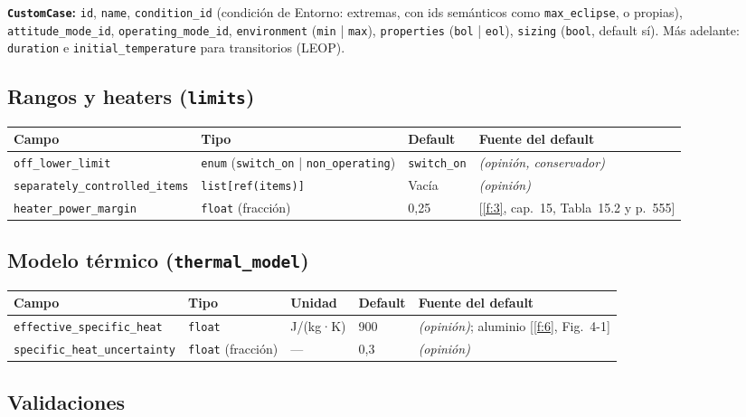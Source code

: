 \documentclass[11pt,a4paper]{article}
\newcommand{\code}[1]{\texttt{#1}}
\newcommand{\op}[1]{\textcolor{opinion}{\textit{(#1)}}}
\newcommand{\f}[1]{\ref{f:#1}}
\begin{document}
\textbf{\code{CustomCase}:} \code{id}, \code{name}, \code{condition\_id} (condición de Entorno: extremas, con ids semánticos como \code{max\_eclipse}, o propias), \code{attitude\_mode\_id}, \code{operating\_mode\_id}, \code{environment} (\code{min} | \code{max}), \code{properties} (\code{bol} | \code{eol}), \code{sizing} (\code{bool}, default sí). Más adelante: \code{duration} e \code{initial\_temperature} para transitorios (LEOP).

\subsection{Rangos y heaters (\code{limits})}

{\small
\begin{xltabular}{\textwidth}{@{}P{4.6cm}P{4.4cm}P{1.6cm}L@{}}
\toprule
\textbf{Campo} & \textbf{Tipo} & \textbf{Default} & \textbf{Fuente del default} \\
\midrule
\endhead
\code{off\_lower\_limit} & \code{enum} (\code{switch\_on} | \code{non\_operating}) & \code{switch\_on} & \op{opinión, conservador} \\
\code{separately\_controlled\_items} & \code{list[ref(items)]} & Vacía & \op{opinión} \\
\code{heater\_power\_margin} & \code{float} (fracción) & 0,25 & [\f{3}, cap.~15, Tabla~15.2 y p.~555] \\
\bottomrule
\end{xltabular}
}

\subsection{Modelo térmico (\code{thermal\_model})}

{\small
\begin{xltabular}{\textwidth}{@{}P{4.6cm}P{2.6cm}P{1.8cm}P{1.4cm}L@{}}
\toprule
\textbf{Campo} & \textbf{Tipo} & \textbf{Unidad} & \textbf{Default} & \textbf{Fuente del default} \\
\midrule
\endhead
\code{effective\_specific\_heat} & \code{float} & J/(kg·K) & 900 & \op{opinión}; aluminio [\f{6}, Fig.~4-1] \\
\code{specific\_heat\_uncertainty} & \code{float} (fracción) & --- & 0,3 & \op{opinión} \\
\bottomrule
\end{xltabular}
}

\subsection{Validaciones}
\end{document}
